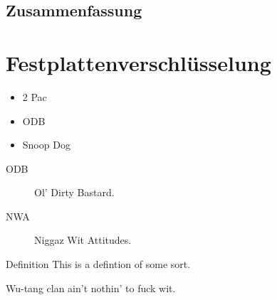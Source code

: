 \documentclass[xetex,mathserif,serif]{beamer}
\begin{document}
	\subsection{Zusammenfassung}
		\begin{frame}
		\blindtext
		\end{frame}
	\section{Festplattenverschlüsselung}



	\begin{frame}
		\begin{itemize}
			\item 2 Pac
			\item ODB
			\item Snoop Dog
		\end{itemize}
	\end{frame}

	\begin{frame}
		\begin{description}
			\item[ODB] Ol' Dirty Bastard.
			\item[NWA] Niggaz Wit Attitudes.
		\end{description}
		\end{frame}

	\begin{frame}
		\begin{block}{Definition}
			This is a defintion of some sort.
		\end{block}
	\end{frame}

	\begin{frame}
		\begin{theorem}[RZA, 1993]
			Wu-tang clan ain't nothin' to fuck wit.
		\end{theorem}
	\end{frame}
\end{document}
